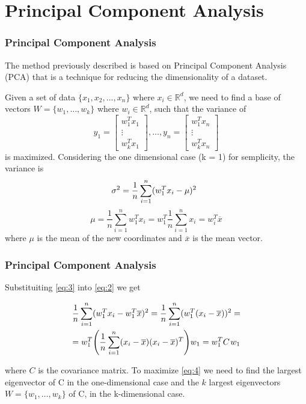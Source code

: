 \documentclass[10pt]{beamer}
\begin{document}
\section{Principal Component Analysis}
\begin{frame}
    \frametitle{Principal Component Analysis}
    
    The method previously described is based on Principal Component Analysis (PCA) that is a technique for reducing the dimensionality of a dataset. \vspace{4 pt}

    Given a set of data $ \{x_1, x_2, \dots, x_n \} $ where $ x_i \in \mathbb{R}^d $, we need to find a base of vectors $ W = \{w_1, \dots ,w_k \} $ where $ w_i \in \mathbb{R}^d $, such that the variance of 
    \begin{equation} y_1 = \begin{bmatrix} w_1^T x_1 \\ \vdots \\ w_k^T x_1 \end{bmatrix} , \dots, y_n = \begin{bmatrix} w_1^T x_n \\ \vdots \\ w_k^T x_n \end{bmatrix} \end{equation} is maximized. Considering the one dimensional case (k = 1) for semplicity, the variance is 
    \begin{equation} \sigma^2 = \label{eq:2} \frac{1}{n} \sum_{i=1}^{n} (w_1^T x_i- \mu)^2 \hspace{5 pt} \end{equation} 
    \begin{equation} \label{eq:3} \mu = \frac{1}{n} \sum_{i=1}^{n} w_1^T x_i = w_1^T \frac{1}{n} \sum_{i=1}^{n} x_i = w_i^T \overline x \end{equation} where $ \mu $ is the mean of the new coordinates and $ \overline x $ is the mean vector.
\end{frame}

\begin{frame}
    \frametitle{Principal Component Analysis}

    Substituiting \eqref{eq:3} into \eqref{eq:2} we get 

    \begin{gather} \nonumber \frac{1}{n} \sum_{i=1}^{n} (w_1^T x_i - w_1^T \overline x)^2 = \frac{1}{n} \sum_{i=1}^{n} (w_1^T (x_i - \overline x))^2 = 
        \\ \label{eq:4} = w_1^T \Bigg(\frac{1}{n} \sum_{i=1}^{n} (x_i - \overline x) (x_i - \overline x)^T\Bigg) w_1 = w_1^T C \hspace{1 pt} w_1 
    \end{gather}

    where $ C $ is the covariance matrix. To maximize \eqref{eq:4} we need to find the largest eigenvector of C in the one-dimensional case and the $ k $ largest eigenvectors $ W = \{w_1, \dots, w_k\} $ of C, in the k-dimensional case.
\end{frame}
\end{document}
